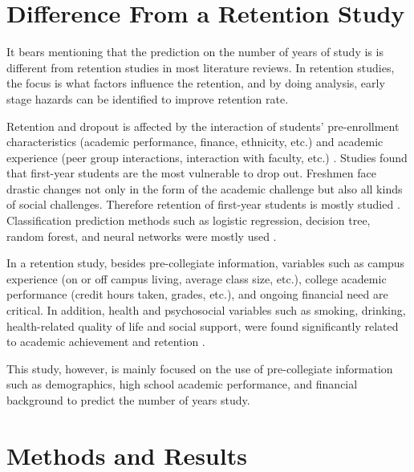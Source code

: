 \documentclass[12pt,english]{report}
\begin{document}
\section{Difference From a Retention Study}
It bears mentioning that the prediction on the number of years of study is is different from retention studies in most literature reviews. In retention studies, the focus is what factors influence the retention, and by doing analysis, early stage hazards can be identified to improve retention rate.
% 
% 

Retention and dropout is affected by the interaction of students' pre-enrollment characteristics (academic performance, finance, ethnicity, etc.) and academic experience (peer group interactions, interaction with faculty, etc.) \citep{Tinto1975, Tinto1982, Terenzini1981}. Studies found that first-year students are the most vulnerable to drop out. Freshmen face drastic changes not only in  the form of the academic challenge but also all kinds of social challenges. Therefore retention of first-year students is mostly studied  \citep{Permzadian2016, Kovacic10earlyprediction, Horstmanshof2007, Noble2007}. Classification prediction methods such as logistic regression, decision tree, random forest, and neural networks were mostly used \citep{dekker2009, AdamGaither2005, quadri2010drop, yu2010data, Herzog2006, Lin2009,zhang2010using, Herzog2006}.

In a retention study, besides  pre-collegiate information, variables such as campus experience (on or off campus living, average class size, etc.), college academic performance (credit hours taken, grades, etc.), and ongoing financial need are critical.  In addition, health and psychosocial variables such as smoking, drinking, health-related quality of life and social support, were found significantly related to  academic achievement and retention \citep{deberard2004predictors, maney1990predicting, musgrave1997personality, cutrona1994perceived}. 

This study, however, is mainly focused on the use of pre-collegiate information such as demographics, high school academic performance, and financial background to predict the number of years study.  

\section{Methods and Results}
\end{document}
